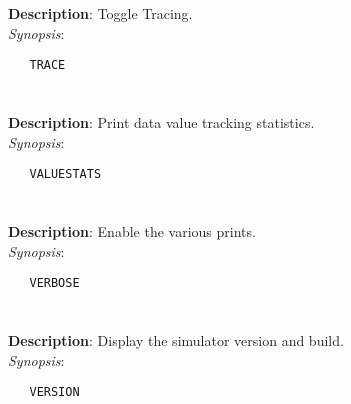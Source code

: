 \section{\quad{}}
\label{manpages:TRACE}
\label{manpages:trace}
\vspace{-0.1in}
{\bf Description}: 	Toggle Tracing.\\[1.5ex]
{\em Synopsis}:
\vspace{-0.05in}
\scriptsize
\begin{lstlisting}
   TRACE   																							
\end{lstlisting}
\normalsize
\vspace{-0.05in}


\section{\quad{}}
\label{manpages:VALUESTATS}
\label{manpages:valuestats}
\vspace{-0.1in}
{\bf Description}: 	Print data value tracking statistics.\\[1.5ex]
{\em Synopsis}:
\vspace{-0.05in}
\scriptsize
\begin{lstlisting}
   VALUESTATS   																				
\end{lstlisting}
\normalsize
\vspace{-0.05in}


\section{\quad{}}
\label{manpages:VERBOSE}
\label{manpages:verbose}
\vspace{-0.1in}
{\bf Description}: 	Enable the various prints.\\[1.5ex]
{\em Synopsis}:
\vspace{-0.05in}
\scriptsize
\begin{lstlisting}
   VERBOSE   																						
\end{lstlisting}
\normalsize
\vspace{-0.05in}


\section{\quad{}}
\label{manpages:VERSION}
\label{manpages:version}
\vspace{-0.1in}
{\bf Description}: 	Display the simulator version and build.\\[1.5ex]
{\em Synopsis}:
\vspace{-0.05in}
\scriptsize
\begin{lstlisting}
   VERSION   																				
\end{lstlisting}
\normalsize
\vspace{-0.05in}


